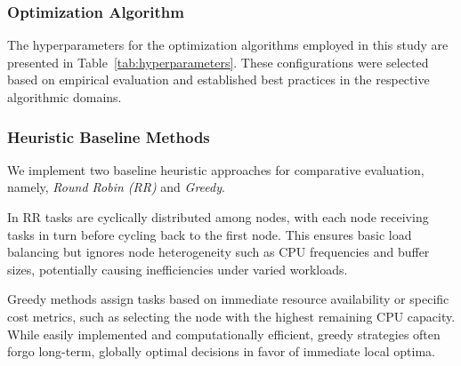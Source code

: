 \documentclass[preprint,12pt]{elsarticle}
\begin{document}
\subsubsection{Optimization Algorithm}
The hyperparameters for the optimization algorithms employed in this study are presented in Table~\ref{tab:hyperparameters}. These configurations were selected based on empirical evaluation and established best practices in the respective algorithmic domains.

\begin{table}[htbp]
\centering
\caption{Algorithm Hyperparameters}
\label{tab:hyperparameters}
\end{table}


\subsubsection{Heuristic Baseline Methods}
We implement two baseline heuristic approaches for comparative evaluation, namely, \emph{Round Robin (RR)} and \emph{Greedy}.

In RR tasks are cyclically distributed among nodes, with each node receiving tasks in turn before cycling back to the first node. This ensures basic load balancing but ignores node heterogeneity such as CPU frequencies and buffer sizes, potentially causing inefficiencies under varied workloads. 

Greedy methods assign tasks based on immediate resource availability or specific cost metrics, such as selecting the node with the highest remaining CPU capacity. While easily implemented and computationally efficient, greedy strategies often forgo long-term, globally optimal decisions in favor of immediate local optima.
\end{document}

